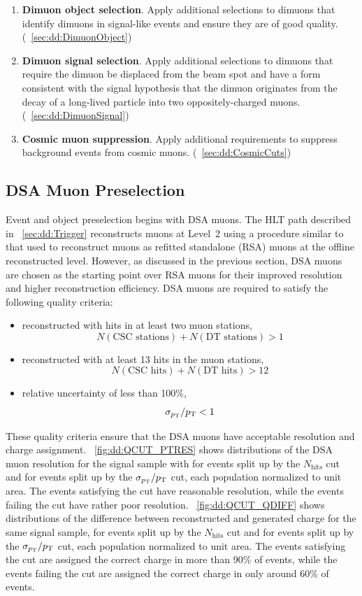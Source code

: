 \begin{enumerate}
  \item \textbf{Dimuon object selection}. Apply additional selections to dimuons that identify dimuons in signal-like events and ensure they are of good quality. (\Sec~\ref{sec:dd:DimuonObject})
  \item \textbf{Dimuon signal selection}. Apply additional selections to dimuons that require the dimuon be displaced from the beam spot and have a form consistent with the signal hypothesis that the dimuon originates from the decay of a long-lived particle into two oppositely-charged muons. (\Sec~\ref{sec:dd:DimuonSignal})
  \item \textbf{Cosmic muon suppression}. Apply additional requirements to suppress background events from cosmic muons. (\Sec~\ref{sec:dd:CosmicCuts})
\end{enumerate}

\subsection{DSA Muon Preselection}
\label{sec:dd:DSAQuality}
Event and object preselection begins with DSA muons.
The HLT path described in \Sec~\ref{sec:dd:Trigger} reconstructs muons at Level~2 using a procedure similar to that used to reconstruct muons as refitted standalone (RSA) muons at the offline reconstructed level.
However, as discussed in the previous section, DSA muons are chosen as the starting point over RSA muons for their improved \pT resolution and higher reconstruction efficiency.
DSA muons are required to satisfy the following quality criteria:
\begin{itemize}
  \item reconstructed with hits in at least two muon stations, \ie $$N(\text{CSC stations}) + N(\text{DT stations}) > 1$$
  \item reconstructed with at least 13 hits in the muon stations, \ie $$N(\text{CSC hits}) + N(\text{DT hits}) > 12$$
  \item relative \pT uncertainty of less than 100\%, \ie $$\sigma_{p_{\mathrm{T}}}/p_{\mathrm{T}} < 1$$
\end{itemize}

These quality criteria ensure that the DSA muons have acceptable \pT resolution and charge assignment.
\Fig~\ref{fig:dd:QCUT_PTRES} shows distributions of the DSA muon \pT resolution for the \twoMu signal sample with  for events split up by the $N_\text{hits}$ cut and for events split up by the $\sigma_{p_{\mathrm{T}}}/p_{\mathrm{T}}$ cut, each population normalized to unit area.
The events satisfying the cut have reasonable \pT resolution, while the events failing the cut have rather poor \pT resolution.
\Fig~\ref{fig:dd:QCUT_QDIFF} shows distributions of the difference between reconstructed and generated charge for the same signal sample, for events split up by the $N_\text{hits}$ cut and for events split up by the $\sigma_{p_{\mathrm{T}}}/p_{\mathrm{T}}$ cut, each population normalized to unit area.
The events satisfying the cut are assigned the correct charge in more than 90\% of events, while the events failing the cut are assigned the correct charge in only around 60\% of events.

